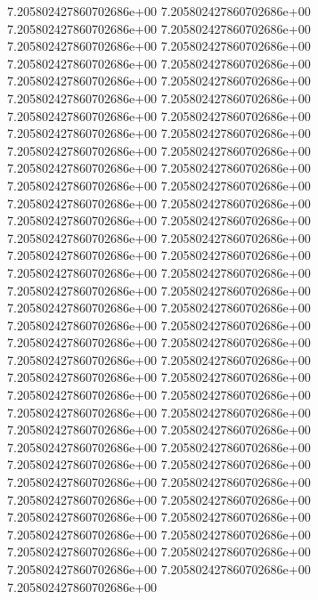 7.205802427860702686e+00	7.205802427860702686e+00	7.205802427860702686e+00	7.205802427860702686e+00	7.205802427860702686e+00	7.205802427860702686e+00	7.205802427860702686e+00	7.205802427860702686e+00	7.205802427860702686e+00	7.205802427860702686e+00	7.205802427860702686e+00	7.205802427860702686e+00	7.205802427860702686e+00	7.205802427860702686e+00	7.205802427860702686e+00	7.205802427860702686e+00	7.205802427860702686e+00	7.205802427860702686e+00	7.205802427860702686e+00	7.205802427860702686e+00	7.205802427860702686e+00	7.205802427860702686e+00	7.205802427860702686e+00	7.205802427860702686e+00	7.205802427860702686e+00	7.205802427860702686e+00	7.205802427860702686e+00	7.205802427860702686e+00	7.205802427860702686e+00	7.205802427860702686e+00	7.205802427860702686e+00	7.205802427860702686e+00	7.205802427860702686e+00	7.205802427860702686e+00	7.205802427860702686e+00	7.205802427860702686e+00	7.205802427860702686e+00	7.205802427860702686e+00	7.205802427860702686e+00	7.205802427860702686e+00	7.205802427860702686e+00	7.205802427860702686e+00	7.205802427860702686e+00	7.205802427860702686e+00	7.205802427860702686e+00	7.205802427860702686e+00	7.205802427860702686e+00	7.205802427860702686e+00	7.205802427860702686e+00	7.205802427860702686e+00	7.205802427860702686e+00	7.205802427860702686e+00	7.205802427860702686e+00	7.205802427860702686e+00	7.205802427860702686e+00	7.205802427860702686e+00	7.205802427860702686e+00	7.205802427860702686e+00	7.205802427860702686e+00	7.205802427860702686e+00	7.205802427860702686e+00	7.205802427860702686e+00	7.205802427860702686e+00	7.205802427860702686e+00	7.205802427860702686e+00	7.205802427860702686e+00	7.205802427860702686e+00

